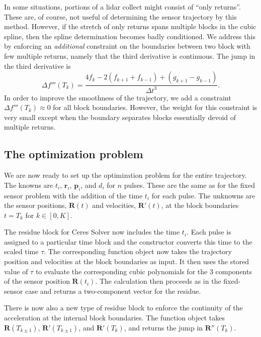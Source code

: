 \documentclass
[rmp,reprint,
twocolumn,amsmath,showkeys,letterpaper,raggedbottom]{revtex4-2}
\begin{document}
In some situations, portions of a lidar collect might consist of ``only
returns''.  These are, of course, not useful of determining the sensor
trajectory by this method.  However, if the stretch of only returns
spans multiple blocks in the cubic spline, then the spline determination
becomes badly conditioned.  We address this by enforcing an {\it
  additional} constraint on the boundaries between two block with few
multiple returns, namely that the third derivative is continuous.  The
jump in the third derivative is
\begin{equation}
  \Delta f'''(T_k) =
  \frac{4f_k - 2(f_{k+1}+f_{k-1}) + (g_{k+1}-g_{k-1})}
       {\Delta t^3}.
\end{equation}
In order to improve the smoothness of the trajectory, we add a
constraint $\Delta f'''(T_k) \approx 0$ for all block boundaries.
However, the weight for this constraint is very small except when the
boundary separates blocks essentially devoid of multiple returns.

\subsection{The optimization problem}

We are now ready to set up the optimization problem for the entire
trajectory.  The knowns are $t_i$, $\mathbf r_i$, $\mathbf p_i$, and
$d_i$ for $n$ pulses.  These are the same as for the fixed sensor
problem with the addition of the time $t_i$ for each pulse.  The
unknowns are the sensor positions, $\mathbf R(t)$ and velocities,
$\mathbf R'(t)$, at the block boundaries $t = T_k$ for $k \in [0,K]$.

The residue block for Ceres Solver now includes the time $t_i$.  Each
pulse is assigned to a particular time block and the constructor
converts this time to the scaled time $\tau$.  The corresponding
function object now takes the trajectory position and velocities at the
block boundaries as input.  It then uses the stored value of $\tau$ to
evaluate the corresponding cubic polynomials for the 3 components of the
sensor position $\mathbf R(t_i)$.  The calculation then proceeds as in
the fixed-sensor case and returns a two-component vector for the
residue.

There is now also a new type of residue block to enforce the continuity
of the acceleration at the internal block boundaries.  The function
object takes $\mathbf R(T_{k\pm1})$, $\mathbf R'(T_{k\pm1})$, and
$\mathbf R'(T_k)$, and returns the jump in $\mathbf R''(T_k)$.
\end{document}

